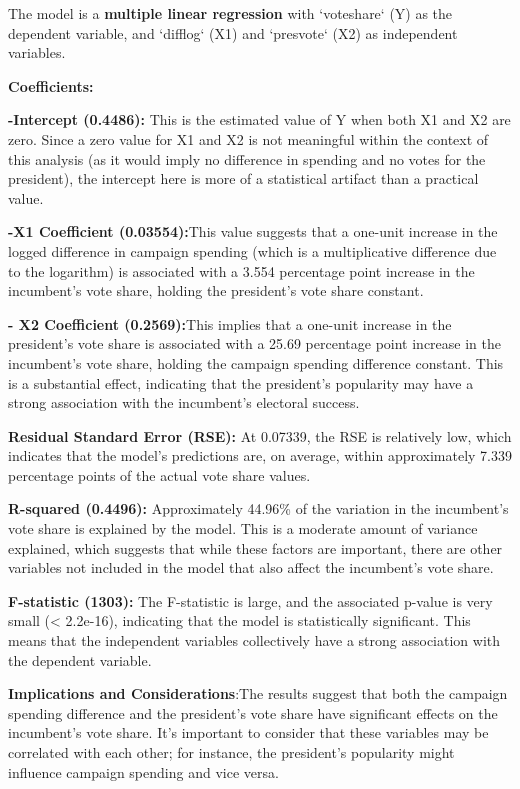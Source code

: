 \documentclass[12pt]{article}
\begin{document}
The model is a \textbf{multiple linear regression} with `voteshare` (Y) as the dependent variable, and `difflog` (X1) and `presvote` (X2) as independent variables. 

\textbf{Coefficients:}

\textbf{-Intercept (0.4486):} This is the estimated value of Y when both X1 and X2 are zero. Since a zero value for X1 and X2 is not meaningful within the context of this analysis (as it would imply no difference in spending and no votes for the president), the intercept here is more of a statistical artifact than a practical value.
   
\textbf{-X1 Coefficient (0.03554):}This value suggests that a one-unit increase in the logged difference in campaign spending (which is a multiplicative difference due to the logarithm) is associated with a 3.554 percentage point increase in the incumbent's vote share, holding the president's vote share constant.

 \textbf{  - X2 Coefficient (0.2569):}This implies that a one-unit increase in the president's vote share is associated with a 25.69 percentage point increase in the incumbent's vote share, holding the campaign spending difference constant. This is a substantial effect, indicating that the president's popularity may have a strong association with the incumbent's electoral success.

 \textbf{Residual Standard Error (RSE):} At 0.07339, the RSE is relatively low, which indicates that the model's predictions are, on average, within approximately 7.339 percentage points of the actual vote share values.
   
\textbf{R-squared (0.4496):} Approximately 44.96\% of the variation in the incumbent's vote share is explained by the model. This is a moderate amount of variance explained, which suggests that while these factors are important, there are other variables not included in the model that also affect the incumbent's vote share.
   
\textbf{F-statistic (1303):} The F-statistic is large, and the associated p-value is very small (< 2.2e-16), indicating that the model is statistically significant. This means that the independent variables collectively have a strong association with the dependent variable.

\textbf{Implications and Considerations}:The results suggest that both the campaign spending difference and the president's vote share have significant effects on the incumbent's vote share. It's important to consider that these variables may be correlated with each other; for instance, the president's popularity might influence campaign spending and vice versa.
\end{document}
